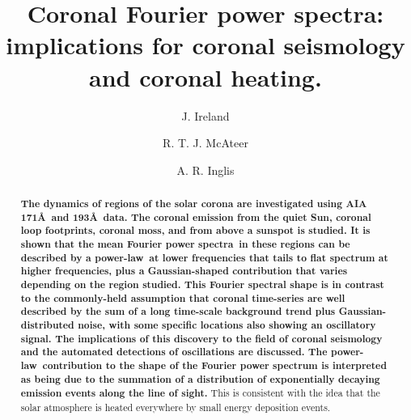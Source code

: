 \documentclass[referee]{aastex}
\newcommand{\PA}{power spectra}
\newcommand{\PL}{power-law}
\newcommand{\mFpa}{mean Fourier \PA}
\begin{document}

\title{Coronal Fourier power spectra: implications for coronal
  seismology and coronal heating.}


\author{J. Ireland}

\author{R. T. J. McAteer}

\author{A. R. Inglis}


\begin{abstract}

  {\bf The dynamics of regions of the solar corona are investigated
    using AIA 171\AA\ and 193\AA\ data.  The coronal emission from the
    quiet Sun, coronal loop footprints, coronal moss, and from above a
    sunspot is studied.  It is shown that the \mFpa\ in these regions
    can be described by a \PL\ at lower frequencies that tails to flat
    spectrum at higher frequencies, plus a Gaussian-shaped
    contribution that varies depending on the region studied. This
    Fourier spectral shape is in contrast to the commonly-held
    assumption that coronal time-series are well described by the sum
    of a long time-scale background trend plus Gaussian-distributed
    noise, with some specific locations also showing an oscillatory
    signal.  The implications of this discovery to the field of
    coronal seismology and the automated detections of oscillations
    are discussed.  The \PL\ contribution to the shape of the Fourier
    power spectrum is interpreted as being due to the summation of a
    distribution of exponentially decaying emission events along the
    line of sight.}  This is consistent with the idea that the solar
  atmosphere is heated everywhere by small energy deposition events.
\end{abstract}
\end{document}
